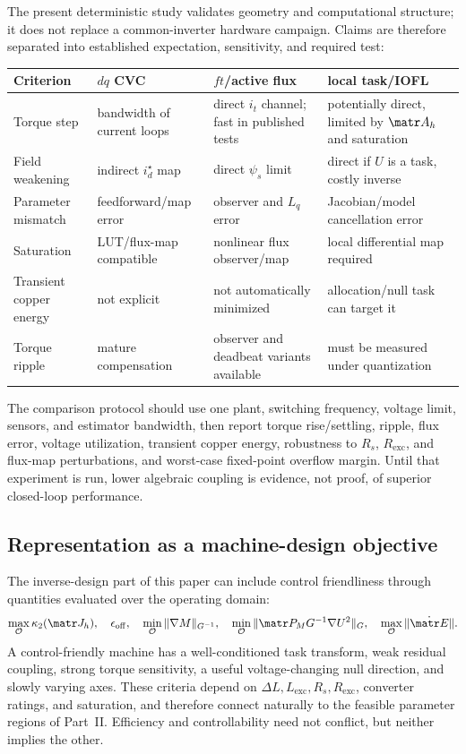 The present deterministic study validates geometry and computational
structure; it does not replace a common-inverter hardware campaign. Claims are
therefore separated into established expectation, sensitivity, and required
test:
\begin{center}
\begin{tabularx}{\textwidth}{lXXX}
\toprule
Criterion & \(dq\) CVC & \(ft\)/active flux & local task/IOFL\\
\midrule
Torque step & bandwidth of current loops & direct \(i_t\) channel; fast in published tests & potentially direct, limited by \(\matr A_h\) and saturation\\
Field weakening & indirect \(i_d^\star\) map & direct \(\psi_s\) limit & direct if \(U\) is a task, costly inverse\\
Parameter mismatch & feedforward/map error & observer and \(L_q\) error & Jacobian/model cancellation error\\
Saturation & LUT/flux-map compatible & nonlinear flux observer/map & local differential map required\\
Transient copper energy & not explicit & not automatically minimized & allocation/null task can target it\\
Torque ripple & mature compensation & observer and deadbeat variants available & must be measured under quantization\\
\bottomrule
\end{tabularx}
\end{center}
The comparison protocol should use one plant, switching frequency, voltage
limit, sensors, and estimator bandwidth, then report torque rise/settling,
ripple, flux error, voltage utilization, transient copper energy, robustness
to \(R_s\), \(R_{\mathrm{exc}}\), and flux-map perturbations, and worst-case
fixed-point overflow margin. Until that experiment is run, lower algebraic
coupling is evidence, not proof, of superior closed-loop performance.

\subsection{Representation as a machine-design objective}

The inverse-design part of this paper can include control friendliness through
quantities evaluated over the operating domain:
\[
 \max_{\mathcal O}\kappa_2(\matr J_h),\quad
 \epsilon_{\mathrm{off}},\quad
 \min_{\mathcal O}\|\nabla M\|_{G^{-1}},\quad
 \min_{\mathcal O}\|\matr P_MG^{-1}\nabla U^2\|_G,\quad
 \max_{\mathcal O}\|\dot{\matr E}\|.
\]
A control-friendly machine has a well-conditioned task transform, weak
residual coupling, strong torque sensitivity, a useful voltage-changing null
direction, and slowly varying axes. These criteria depend on
\(\Delta L,L_{\mathrm{exc}},R_s,R_{\mathrm{exc}}\), converter ratings, and
saturation, and therefore connect naturally to the feasible parameter regions
of Part~II. Efficiency and controllability need not conflict, but neither
implies the other.

